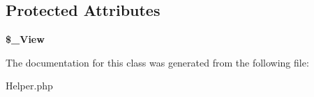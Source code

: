 \subsection*{Protected Attributes}
\begin{DoxyCompactItemize}
\item 
\hypertarget{classHelper_a700e3c0f47edc5c9f927e5b2b6a0fbf3}{
{\bfseries \$\_\-View}}
\label{classHelper_a700e3c0f47edc5c9f927e5b2b6a0fbf3}

\end{DoxyCompactItemize}


The documentation for this class was generated from the following file:\begin{DoxyCompactItemize}
\item 
Helper.php\end{DoxyCompactItemize}
